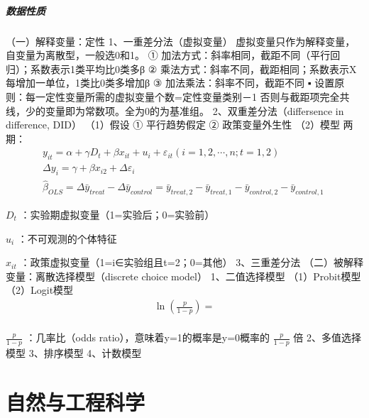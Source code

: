 \documentclass[12pt]{book}
\begin{document}
\subsubsection{数据性质}
（一）解释变量：定性
1、一重差分法（虚拟变量）
虚拟变量只作为解释变量，自变量为离散型，一般选0和1。
① 加法方式：斜率相同，截距不同（平行回归）；系数表示1类平均比0类多β
② 乘法方式：斜率不同，截距相同；系数表示X每增加一单位，1类比0类多增加β
③ 加法乘法：斜率不同，截距不同
▪ 设置原则：每一定性变量所需的虚拟变量个数=定性变量类别－1
否则与截距项完全共线，少的变量即为常数项。全为0的为基准组。
2、双重差分法（differsence in difference, DID）
（1）假设	
① 平行趋势假定
② 政策变量外生性
（2）模型
 两期：
\begin{gather*}
    y_{it}=\alpha+\gamma D_t+\beta x_{it}+u_i+\varepsilon_{it} (i=1,2,\cdots,n;t=1,2) \\ \Delta y_i = \gamma+\beta x_{i2}+\Delta \varepsilon_i \\ {\hat{\beta}}_{OLS}=\Delta{\bar{y}}_{treat}-\Delta \bar{y}_{control} = \bar{y}_{treat,2}-\bar{y}_{treat,1}- \bar{y}_{control,2}-\bar{y}_{control,1}\
\end{gather*}
\par $D_t$ ：实验期虚拟变量（1=实验后；0=实验前）
\par $u_i$ ：不可观测的个体特征
\par $x_{it}$ ：政策虚拟变量（1=i∈实验组且t=2；0=其他）
3、三重差分法
（二）被解释变量：离散选择模型（discrete choice model）
1、二值选择模型
（1）Probit模型
（2）Logit模型
\begin{gather*}
    \ln{\left(\frac{p}{1-p}\right)}=\\ 
\end{gather*}

$\frac{p}{1-p}$ ：几率比（odds ratio），意味着y=1的概率是y=0概率的 $\frac{p}{1-p}$ 倍
2、多值选择模型
3、排序模型
4、计数模型
























\part{自然与工程科学}
\end{document}
